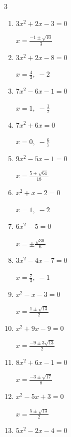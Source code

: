\begin{multicols}{3}
\begin{enumerate}
  \itemsep=55pt
  \item $3x^{2}+2x-3=0$

        $\displaystyle x=\frac{-1\pm \sqrt{10}}{3}$

  \item $3x^{2}+2x-8=0$

        $\displaystyle x=\frac{4}{3}, \; -2$

  \item $7x^{2}-6x-1=0$

        $\displaystyle x=1, \; -\frac{1}{7}$

  \item $7x^{2}+6x=0$

        $\displaystyle x=0, \; -\frac{6}{7}$

  \item $9x^{2}-5x-1=0$

        $\displaystyle x=\frac{5\pm \sqrt{61}}{18}$

  \item $x^{2}+x-2=0$

        $\displaystyle x=1, \; -2$

  \item $6x^{2}-5=0$

        $\displaystyle x=\pm \frac{\sqrt{30}}{6}$

\columnbreak %

  \item $3x^{2}-4x-7=0$

        $\displaystyle x=\frac{7}{3}, \; -1$

  \item $x^{2}-x-3=0$

        $\displaystyle x=\frac{1\pm \sqrt{13}}{2}$

  \item $x^{2}+9x-9=0$

        $\displaystyle x=\frac{-9\pm 3\sqrt{13}}{2}$

  \item $8x^{2}+6x-1=0$

        $\displaystyle x=\frac{-3\pm \sqrt{17}}{8}$

  \item $x^{2}-5x+3=0$

        $\displaystyle x=\frac{5\pm \sqrt{13}}{2}$

  \item $5x^{2}-2x-4=0$


\end{enumerate}
\end{multicols}
